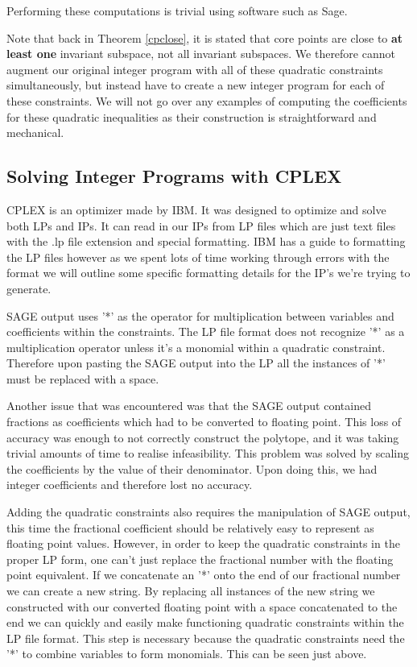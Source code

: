 \documentclass[11pt]{article} %
\theoremstyle{definition}
\theoremstyle{remark}
\begin{document}
Performing these computations is trivial using software such as Sage.

Note that back in Theorem \eqref{cpclose}, it is stated that core points are close to \textbf{at least one} invariant subspace, not all invariant subspaces. We therefore cannot augment our original integer program with all of these quadratic constraints simultaneously, but instead have to create a new integer program for each of these constraints. We will not go over any examples of computing the coefficients for these quadratic inequalities as their construction is straightforward and mechanical.

\subsection{Solving Integer Programs with CPLEX}

CPLEX is an optimizer made by IBM. It was designed to optimize and solve both LPs and IPs. It can read in our IPs from LP files which are just text files with the .lp file extension and special formatting. IBM has a guide to formatting the LP files however as we spent lots of time working through errors with the format we will outline some specific formatting details for the IP's we're trying to generate. 

SAGE output uses '*' as the operator for multiplication between variables and coefficients within the constraints. The LP file format does not recognize '*' as a multiplication operator unless it's a monomial within a quadratic constraint. Therefore upon pasting the SAGE output into the LP all the instances of '*' must be replaced with a space. 

Another issue that was encountered was that the SAGE output contained fractions as coefficients which had to be converted to floating point. This loss of accuracy was enough to not correctly construct the polytope, and it was taking trivial amounts of time to realise infeasibility. This problem was solved by scaling the coefficients by the value of their denominator. Upon doing this, we had integer coefficients and therefore lost no accuracy.

Adding the quadratic constraints also requires the manipulation of SAGE output, this time the fractional coefficient should be relatively easy to represent as floating point values. However, in order to keep the quadratic constraints in the proper LP form, one can't just replace the fractional number with the floating point equivalent. If we concatenate an '*' onto the end of our fractional number we can create a new string. By replacing all instances of the new string we constructed with our converted floating point with a space concatenated to the end we can quickly and easily make functioning quadratic constraints within the LP file format. This step is necessary because the quadratic constraints need the '*' to combine variables to form monomials. This can be seen just above. 
\end{document}
